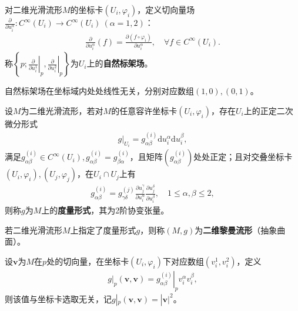 \documentclass[../../main.tex]{subfiles}%
\begin{document}
\begin{definition}
对二维光滑流形$M$的坐标卡$(U_i,\varphi_i)$，定义切向量场$\frac{\partial}{\partial u_i^\alpha}:C^\infty(U_i)\to C^\infty(U_i)\ (\alpha=1,2)$：
\begin{align}
\frac{\partial}{\partial u_i^\alpha}(f)=\frac{\partial(f\circ\varphi_i)}{\partial u_i^\alpha},\quad \forall f\in C^\infty(U_i).\label{eq:6.4}
\end{align}
称$\left\{p;\left.\frac{\partial}{\partial u_i^1}\right|_p,\left.\frac{\partial}{\partial u_i^2}\right|_p\right\}$为$U_i$上的\textbf{自然标架场}。
\end{definition}

\begin{remark}
自然标架场在坐标域内处处线性无关，分别对应数组$(1,0),(0,1)$。
\end{remark}

\begin{definition}
设$M$为二维光滑流形，若对$M$的任意容许坐标卡$(U_i,\varphi_i)$，存在$U_i$上的正定二次微分形式
\begin{align}
g|_{U_i}=g_{\alpha\beta}^{(i)}\mathrm{d}u_i^\alpha\mathrm{d}u_i^\beta,\label{eq:6.5}
\end{align}
满足$g_{\alpha\beta}^{(i)}\in C^\infty(U_i),g_{\alpha\beta}^{(i)}=g_{\beta\alpha}^{(i)}$，且矩阵$(g_{\alpha\beta}^{(i)})$处处正定；且对交叠坐标卡$(U_i,\varphi_i),(U_j,\varphi_j)$，在$U_i\cap U_j$上有
\begin{align}
g_{\alpha\beta}^{(i)}=g_{\gamma\delta}^{(j)}\frac{\partial u_j^\gamma}{\partial u_i^\alpha}\frac{\partial u_j^\delta}{\partial u_i^\beta},\quad 1\leqslant\alpha,\beta\leqslant2,\label{eq:6.6}
\end{align}
则称$g$为$M$上的\textbf{度量形式}，其为2阶协变张量。
\end{definition}

\begin{definition}
若二维光滑流形$M$上指定了度量形式$g$，则称$(M,g)$为\textbf{二维黎曼流形}（抽象曲面）。
\end{definition}

\begin{proposition}
设$\bm{v}$为$M$在$p$处的切向量，在坐标卡$(U_i,\varphi_i)$下对应数组$(v_i^1,v_i^2)$，定义
\begin{align}
g|_p(\bm{v},\bm{v})=\left.g_{\alpha\beta}^{(i)}\right|_p v_i^\alpha v_i^\beta,\label{eq:6.7}
\end{align}
则该值与坐标卡选取无关，记$g|_p(\bm{v},\bm{v})=|\bm{v}|^2$。
\end{proposition}
\end{document}
